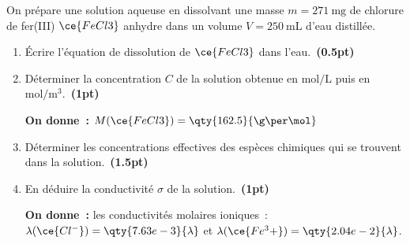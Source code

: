 On prépare une solution aqueuse en dissolvant une masse $m=\qty{271}{\mg}$ de
chlorure de fer(III) $\ce{FeCl3}$ anhydre dans un volume $V=\qty{250}{\mL}$
d'eau distillée.
\begin{enumerate}
    \item Écrire l'équation de dissolution de $\ce{FeCl3}$ dans
          l'eau.~\textbf{(0.5pt)}
    \item Déterminer la concentration $C$ de la solution obtenue en
          $\unit{\mol\per\L}$ puis en $\unit{\mol\per\cubic\m}$.~\textbf{(1pt)}

          \textbf{On donne~:} $M(\ce{FeCl3})=\qty{162.5}{\g\per\mol}$
    \item Déterminer les concentrations effectives des espèces chimiques qui se
          trouvent dans la solution.~\textbf{(1.5pt)}
    \item En déduire la conductivité $\sigma$ de la solution.~\textbf{(1pt)}

          \textbf{On donne~:} les conductivités molaires ioniques~: \\
          $\lambda(\ce{Cl^-})=\qty{7.63e-3}{\lambda}$ et
          $\lambda(\ce{Fe^3+})=\qty{2.04e-2}{\lambda}$.
\end{enumerate}
